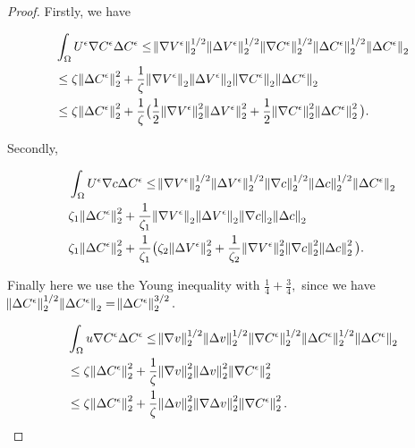 \documentclass[11pt]{article}
\begin{document}
\begin{proof}
Firstly, we have

\begin{equation}
  \begin{split}
    & \int_\Omega U^\epsilon \nabla C^\epsilon \Delta C^\epsilon \leq \norm{\nabla V^\epsilon}_2^{1/2} \norm{\Delta V^\epsilon}_2^{1/2} \norm{\nabla C^\epsilon}_2^{1/2} \norm{\Delta C^\epsilon}_2^{1/2} \norm{\Delta C^\epsilon}_2 \\
    & \leq \zeta \norm{\Delta C^\epsilon}_2^2 + \frac{1}{\zeta} \norm{\nabla V^\epsilon}_2 \norm{\Delta V^\epsilon}_2 \norm{\nabla C^\epsilon}_2 \norm{\Delta C^\epsilon}_2 \\
    & \leq \zeta \norm{\Delta C^\epsilon}_2^2 + \frac{1}{\zeta} \big ( \frac{1}{2} \norm{\nabla V^\epsilon}^2_2 \norm{\Delta V^\epsilon}^2_2 + \frac{1}{2} \norm{\nabla C^\epsilon}^2_2 \norm{\Delta C^\epsilon}^2_2 \big ).
  \end{split}
\end{equation}

Secondly,

\begin{equation}
  \begin{split}
    & \int_\Omega U^\epsilon \nabla c \Delta C^\epsilon \leq \norm{\nabla V^\epsilon}_2^{1/2} \norm{\Delta V^\epsilon}_2^{1/2} \norm{\nabla c}_2^{1/2} \norm{\Delta c}_2^{1/2} \norm{\Delta C^\epsilon}_2 \\
    & \zeta_1 \norm{\Delta C^\epsilon}^2_2 + \frac{1}{\zeta_1} \norm{\nabla V^\epsilon}_2 \norm{\Delta V^\epsilon}_2 \norm{\nabla c}_2 \norm{\Delta c}_2 \\
    & \zeta_1 \norm{\Delta C^\epsilon}^2_2 + \frac{1}{\zeta_1} \big (\zeta_2 \norm{\Delta V^\epsilon}_2^2 + \frac{1}{\zeta_2}  \norm{\nabla V^\epsilon}^2_2  \norm{\nabla c}^2_2 \norm{\Delta c}^2_2 \big ).
  \end{split}
\end{equation}

Finally here we use the Young inequality with $\frac{1}{4} + \frac{3}{4},$ since we have $\norm{\Delta C^\epsilon}_2^{1/2} \norm{\Delta C^\epsilon}_2 = \norm{\Delta C^\epsilon}_2^{3/2}.$

\begin{equation}
  \begin{split}
    & \int_\Omega u \nabla C^\epsilon \Delta C^\epsilon \leq \norm{\nabla v}_2^{1/2} \norm{\Delta v}_2^{1/2} \norm{\nabla C^\epsilon}_2^{1/2} \norm{\Delta C^\epsilon}_2^{1/2} \norm{\Delta C^\epsilon}_2 \\
    & \leq \zeta \norm{\Delta C^\epsilon}_2^2 + \frac{1}{\zeta} \norm{\nabla v}^2_2 \norm{\Delta v}^2_2 \norm{\nabla C^\epsilon}^2_2 \\
    & \leq \zeta \norm{\Delta C^\epsilon}_2^2 + \frac{1}{\zeta} \norm{\Delta v}^2_2 \norm{\nabla \Delta v}^2_2 \norm{\nabla C^\epsilon}^2_2.
  \end{split}
\end{equation}


\end{proof}
\end{document}
